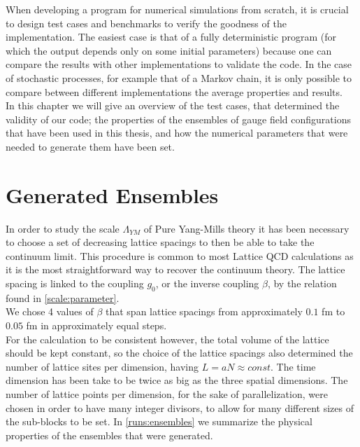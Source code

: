 When developing a program for numerical simulations from scratch, it is crucial to design test cases and benchmarks to verify the goodness of the implementation. The easiest case is that of a fully deterministic program (for which the output depends only on some initial parameters) because one can compare the results with other implementations to validate the code. In the case of stochastic processes, for example that of a Markov chain, it is only possible to compare between different implementations the average properties and results. \\
In this chapter we will give an overview of the test cases, that determined the validity of our code; the properties of the ensembles of gauge field configurations that have been used in this thesis, and how the numerical parameters that were needed to generate them have been set.

\section{Generated Ensembles}
In order to study the scale $\Lambda_{YM}$ of Pure Yang-Mills theory it has been necessary to choose a set of decreasing lattice spacings to then be able to take the continuum limit. This procedure is common to most Lattice QCD calculations as it is the most straightforward way to recover the continuum theory. The lattice spacing is linked to the coupling $g_0$, or the inverse coupling $\beta$, by the relation found in \cref{scale:parameter}.\\ 
We chose 4 values of $\beta$ that span lattice spacings from approximately $0.1$ fm to $0.05$ fm in approximately equal steps. \\
For the calculation to be consistent however, the total volume of the lattice should be kept constant, so the choice of the lattice spacings also determined the number of lattice sites per dimension, having $L = aN\approx const$. The time dimension has been take to be twice as big as the three spatial dimensions. The number of lattice points per dimension, for the sake of parallelization, were chosen in order to have many integer divisors, to allow for many different sizes of the sub-blocks to be set. In \cref{runs:ensembles} we summarize the physical properties of the ensembles that were generated.

